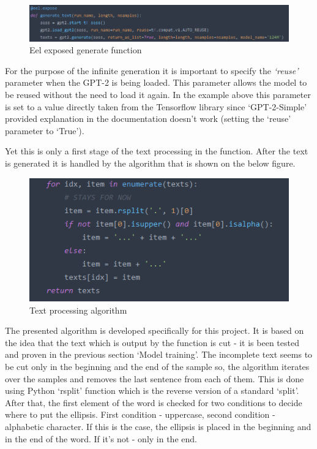 \documentclass[12pt]{report}
\begin{document}
\begin{figure}[ht]
  \centering
  \includegraphics[width=.8\linewidth]{img/generate-text-eel.png}
  \caption{Eel exposed generate function}
  \label{fig:generate_text}
\end{figure}

For the purpose of the infinite generation it is important to specify the \textit{`reuse'} parameter when the GPT-2
is being loaded. This parameter allows the model to be reused without the need to load it again. In the example above
this parameter is set to a value directly taken from the Tensorflow library since `GPT-2-Simple' provided explanation
in the documentation doesn't work (setting the `reuse' parameter to `True').

Yet this is only a first stage of the text processing in the function. After the text is generated it is handled by the
algorithm that is shown on the below figure.

\begin{figure}[ht]
  \centering
  \includegraphics[width=.5\linewidth]{img/text-processing.png}
  \caption{Text processing algorithm}
  \label{fig:process_text}
\end{figure}

\clearpage

The presented algorithm is developed specifically for this project. It is based on the idea that the text which is
output by the function is cut - it is been tested and proven in the previous section `Model training'. The incomplete
text seems to be cut only in the beginning and the end of the sample so, the algorithm iterates over the samples and
removes the last sentence from each of them. This is done using Python `rsplit' function which is the reverse version
of a standard `split'. After that, the first element of the word is checked for two conditions to decide where to put
the ellipsis. First condition - uppercase, second condition - alphabetic character. If this is the case, the ellipsis
is placed in the beginning and in the end of the word. If it's not - only in the end.
\end{document}
